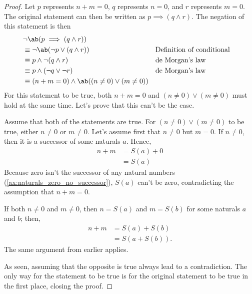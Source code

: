 \begin{proof}
  Let \(p\) represents \(n + m = 0\), \(q\) represents \(n = 0\), and \(r\) represents \(m = 0\).
  The original statement can then be written as \(p \implies (q \land r)\). The negation of this
  statement is then
  \begin{align}
    & \neg \ab(p \implies (q \land r))                                                                           \\
    & \equiv \neg \ab(\neg p \lor (q \land r))                 &  & \textrm{Definition of conditional} \nonumber \\
    & \equiv p \land \neg (q \land r)                          &  & \textrm{de Morgan's law}                     \\
    & \equiv p \land (\neg q \lor \neg r)                      &  & \textrm{de Morgan's law}                     \\
    & \equiv (n + m = 0) \land \ab((n \neq 0) \lor (m \neq 0))
  \end{align}
  For this statement to be true, both \(n + m = 0\) and \((n \neq 0) \lor (m \neq 0)\) must hold at
  the same time. Let's prove that this can't be the case.

  Assume that both of the statements are true. For \((n \neq 0) \lor (m \neq 0)\) to be true, either
  \(n \neq 0\) or \(m \neq 0\). Let's assume first that \(n \neq 0\) but \(m = 0\). If \(n \neq 0\),
  then it is a successor of some naturals \(a\). Hence,
  \begin{align}
    n + m & = S(a) + 0 \\
          & = S(a)
  \end{align}
  Because zero isn't the successor of any natural numbers (\cref{ax:naturals_zero_no_successor}),
  \(S(a)\) can't be zero, contradicting the assumption that \(n + m = 0\).

  If both \(n \neq 0\) and \(m \neq 0\), then \(n = S(a)\) and \(m = S(b)\) for some naturals \(a\)
  and \(b\); then,
  \begin{align}
    n + m & = S(a) + S(b)  \\
          & = S(a + S(b)).
  \end{align}
  The same argument from earlier applies.

  As seen, assuming that the opposite is true always lead to a contradiction. The only way for the
  statement to be true is for the original statement to be true in the first place, closing the
  proof.
\end{proof}

